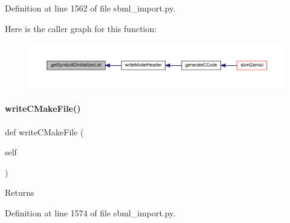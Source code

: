 Definition at line 1562 of file sbml\+\_\+import.\+py.

Here is the caller graph for this function\+:
\nopagebreak
\begin{figure}[H]
\begin{center}
\leavevmode
\includegraphics[width=350pt]{classamici_1_1sbml__import_1_1_sbml_importer_ae0027a630db3a61e19be3dfeaa166304_icgraph}
\end{center}
\end{figure}
\mbox{\label{classamici_1_1sbml__import_1_1_sbml_importer_ada11f0c35bdbd4d23c25f438df36f954}} 
\paragraph{\texorpdfstring{write\+C\+Make\+File()}{writeCMakeFile()}}
{\footnotesize\ttfamily def write\+C\+Make\+File (\begin{DoxyParamCaption}\item[{}]{self }\end{DoxyParamCaption})}

\begin{DoxyReturn}{Returns}

\end{DoxyReturn}


Definition at line 1574 of file sbml\+\_\+import.\+py.

